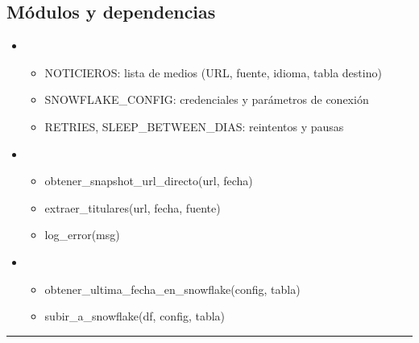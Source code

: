 \documentclass[letterpaper,10pt,spanish]{sphinxmanual}
\begin{document}
\subsection{Módulos y dependencias}
\label{\detokenize{DatosPreparacion:modulos-y-dependencias}}\begin{itemize}
\item {} 
\sphinxAtStartPar
{}
\begin{itemize}
\item {} 
\sphinxAtStartPar
NOTICIEROS: lista de medios (URL, fuente, idioma, tabla destino)

\item {} 
\sphinxAtStartPar
SNOWFLAKE\_CONFIG: credenciales y parámetros de conexión

\item {} 
\sphinxAtStartPar
RETRIES, SLEEP\_BETWEEN\_DIAS: reintentos y pausas

\end{itemize}

\item {} 
\sphinxAtStartPar
{}
\begin{itemize}
\item {} 
\sphinxAtStartPar
obtener\_snapshot\_url\_directo(url, fecha)

\item {} 
\sphinxAtStartPar
extraer\_titulares(url, fecha, fuente)

\item {} 
\sphinxAtStartPar
log\_error(msg)

\end{itemize}

\item {} 
\sphinxAtStartPar
{}
\begin{itemize}
\item {} 
\sphinxAtStartPar
obtener\_ultima\_fecha\_en\_snowflake(config, tabla)

\item {} 
\sphinxAtStartPar
subir\_a\_snowflake(df, config, tabla)

\end{itemize}

\end{itemize}


\bigskip\hrule\bigskip
\end{document}
